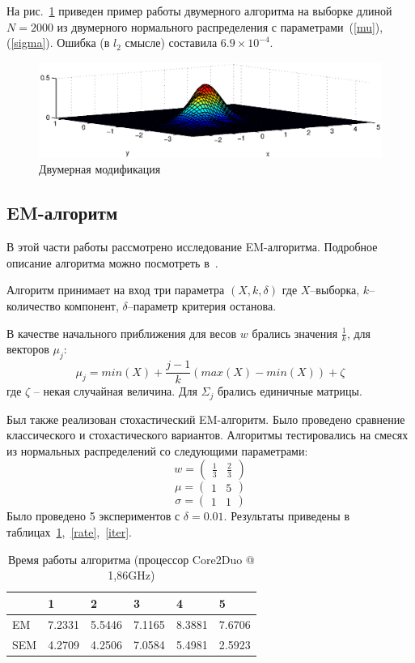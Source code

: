 \documentclass[10pt, a4paper]{article}
\begin{document}
На рис.~\ref{parzen2} приведен пример работы двумерного алгоритма на выборке длиной $N=2000$ из 
двумерного нормального распределения с параметрами~(\ref{mu}), (\ref{sigma}). Ошибка (в $l_2$ смысле)
составила $6.9\times 10^{-4}$.
\begin{figure}[h]
    \includegraphics[width=\textwidth]{parzen2.eps}
    \caption{Двумерная модификация}
    \label{parzen2}
\end{figure}

\newpage

\subsection{EM-алгоритм}
В этой части работы рассмотрено исследование EM-алгоритма. Подробное описание алгоритма 
можно посмотреть в~\cite[\S~2.4]{voron}.

Алгоритм принимает на вход три параметра $(X,k,\delta)$ где $X$--выборка, $k$--количество компонент,
$\delta$--параметр критерия останова.

В качестве начального приближения для весов $w$ брались значения $\frac{1}{k}$, для векторов $\mu_j$:
$$
\mu_j=min(X)+\frac{j-1}{k}(max(X)-min(X))+\zeta
$$
где $\zeta$ -- некая случайная величина. Для $\Sigma_j$ брались единичные матрицы.

Был также реализован стохастический EM-алгоритм. Было проведено сравнение классического и стохастического вариантов.
Алгоритмы тестировались на смесях из нормальных распределений со следующими параметрами:
$$
w=\left(\begin{matrix}
    \frac{1}{3} & \frac{2}{3}
\end{matrix}\right)
$$
$$
\mu=\left(\begin{matrix}
    1 & 5
\end{matrix}\right)
$$
$$
\sigma=\left(\begin{matrix}
    1&1
\end{matrix}\right)
$$
Было проведено 5 экспериментов с $\delta=0.01$. Результаты приведены в
 таблицах~\ref{time},~\ref{rate},~\ref{iter}.

\begin{table}[h]
    \begin{tabular}{|l|l|l|l|l|l|}
        \hline
        &1&2&3&4&5\\
        \hline
        EM&7.2331&5.5446&7.1165&8.3881&7.6706\\
        \hline
        SEM&4.2709&4.2506&7.0584&5.4981&2.5923\\
        \hline
    \end{tabular}
    \caption{Время работы алгоритма (процессор Core2Duo @ 1,86GHz)}
    \label{time}
\end{table}
\end{document}
